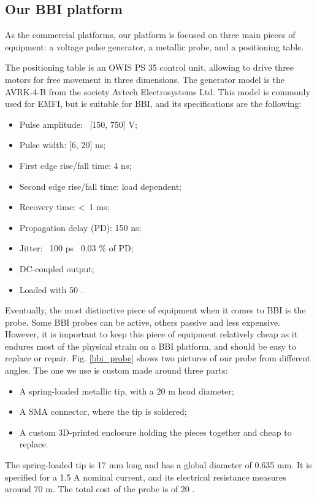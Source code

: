 	\subsection{Our BBI platform}
		As the commercial platforms, our platform is focused on three main pieces of equipment: a voltage pulse generator, a metallic probe, and a positioning table.
		
		The positioning table is an OWIS PS 35 control unit, allowing to drive three motors for free movement in three dimensions.
		The generator model is the AVRK-4-B from the society Avtech Electrosystems Ltd.
		This model is commonly used for EMFI, but is suitable for BBI, and its specifications are the following:
		\begin{itemize}
			\item Pulse amplitude: \textpm\ [150, 750] V;
			\item Pulse width: [6, 20] ns;
			\item First edge rise/fall time: 4 ns;
			\item Second edge rise/fall time: load dependent;
			\item Recovery time: \textless\ 1 ms;
			\item Propagation delay (PD): 150 ns;
			\item Jitter: \textpm\ 100 ps \textpm\ 0.03 \% of PD;
			\item DC-coupled output;
			\item Loaded with 50 \textOmega.
		\end{itemize}
		
		Eventually, the most distinctive piece of equipment when it comes to BBI is the probe.
		Some BBI probes can be active, others passive and less expensive.
		However, it is important to keep this piece of equipment relatively cheap as it endures most of the physical strain on a BBI platform, and should be easy to replace or repair.
		Fig. \ref{bbi_probe} shows two pictures of our probe from different angles.
		The one we use is custom made around three parts:
		\begin{itemize}
			\item A spring-loaded metallic tip, with a 20 \textmu m head diameter;
			\item A SMA connector, where the tip is soldered;
			\item A custom 3D-printed enclosure holding the pieces together and cheap to replace.
		\end{itemize}
		The spring-loaded tip is 17 mm long and has a global diameter of 0.635 mm.
		It is specified for a 1.5 A nominal current, and its electrical resistance measures around 70 m\textOmega.
		The total cost of the probe is of 20 \texteuro.

